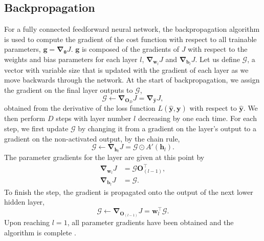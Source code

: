 \documentclass[12pt]{article}
\begin{document}
\subsection{Backpropagation}
For a fully connected feedforward neural network, the backpropagation algorithm is used to compute the gradient of the cost function with respect to all trainable parameters, $\bm{g}=\bm\nabla_{\bm\theta}J$. $\bm{g}$ is composed of the gradients of $J$ with respect to the weights and bias parameters for each layer $l$, $\bm\nabla_{\bm{w}_l}J$ and $\bm\nabla_{\bm{b}_l}J$. Let us define $\bm{\mathcal{G}}$, a vector with variable size that is updated with the gradient of each layer as we move backwards through the network. At the start of backpropagation, we assign the gradient on the final layer outputs to $\bm{\mathcal{G}}$,
\begin{equation}
\bm{\mathcal{G}}\leftarrow \bm\nabla_{\bm{O}_D}J=\bm\nabla_{\hat{\bm{y}}}J, 
\end{equation} 
obtained from the derivative of the loss function $L(\hat{\bm{y}},\bm{y})$ with respect to $\hat{\bm{y}}$. We then perform $D$ steps with layer number $l$ decreasing by one each time. For each step, we first update $\bm{\mathcal{G}}$ by changing it from a gradient on the layer's output to a gradient on the non-activated output, by the chain rule,
\begin{equation}
\bm{\mathcal{G}}\leftarrow \bm{\nabla}_{\bm{h}_l}J=\bm{\mathcal{G}}\odot A'(\bm{h}_l).
\end{equation}
The parameter gradients for the layer are given at this point by
\begin{align}
\bm\nabla_{\bm{w}_l}J&=\bm{\mathcal{G}}\bm{O}_{(l-1)}^{\top},\\
\bm\nabla_{\bm{b}_l}J&=\bm{\mathcal{G}}.
\end{align}
To finish the step, the gradient is propagated onto the output of the next lower hidden layer,
\begin{equation}
\bm{\mathcal{G}}\leftarrow \bm{\nabla}_{\bm{O}_{(l-1)}}J=\bm{w}_l^{\top}\bm{\mathcal{G}}.
\end{equation}
Upon reaching $l=1$, all parameter gradients have been obtained and the algorithm is complete \cite{Rumelhart86, Goodfellow16}.
\end{document}
